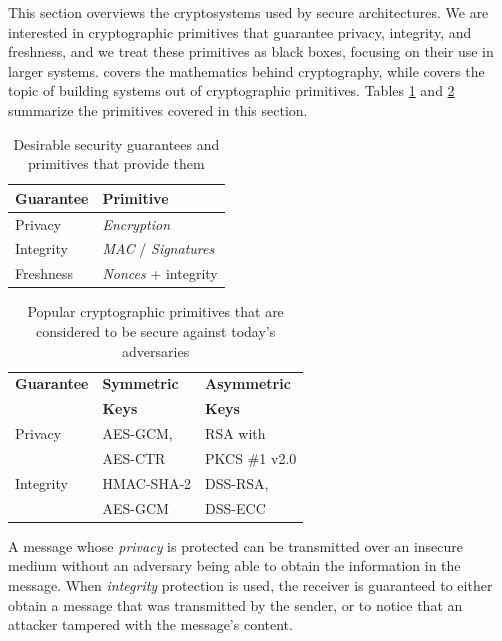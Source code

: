 \label{sec:crypto_primitives}

This section overviews the cryptosystems used by secure architectures. We are
interested in cryptographic primitives that guarantee privacy, integrity, and
freshness, and we treat these primitives as black boxes, focusing on their use
in larger systems. \cite{katz2014crypto} covers the mathematics behind
cryptography, while \cite{ferguson2011crypto} covers the topic of building
systems out of cryptographic primitives. Tables \ref{fig:crypto_names}
and \ref{fig:crypto_primitives} summarize the primitives covered in this
section.

\begin{table}[hbt]
  \centering
  \begin{tabular}{| l | l |}
  \hline
  \textbf{Guarantee} & \textbf{Primitive} \\
  \hline
  Privacy & \textit{Encryption} \\
  \hline
  Integrity & \textit{MAC} / \textit{Signatures} \\
  \hline
  Freshness & \textit{Nonces} + integrity \\
  \hline
  \end{tabular}
  \caption{
    Desirable security guarantees and primitives that provide them
  }
  \label{fig:crypto_names}
\end{table}

\begin{table}[hbt]
  \centering
  \begin{tabular}{| l | l | l |}
  \hline
  \textbf{Guarantee} & \textbf{Symmetric} & \textbf{Asymmetric} \\
                     & \textbf{Keys} & \textbf{Keys} \\
  \hline
  Privacy & AES-GCM, & RSA with \\
          & AES-CTR  & PKCS \#1 v2.0 \\
  \hline
  Integrity & HMAC-SHA-2 & DSS-RSA, \\
            & AES-GCM & DSS-ECC \\
  \hline
  \end{tabular}
  \caption{
    Popular cryptographic primitives that are considered to be secure against
    today's adversaries
  }
  \label{fig:crypto_primitives}
\end{table}

A message whose \textit{privacy} is protected can be transmitted over an
insecure medium without an adversary being able to obtain the information in
the message. When \textit{integrity} protection is used, the receiver is
guaranteed to either obtain a message that was transmitted by the sender, or to
notice that an attacker tampered with the message's content.

